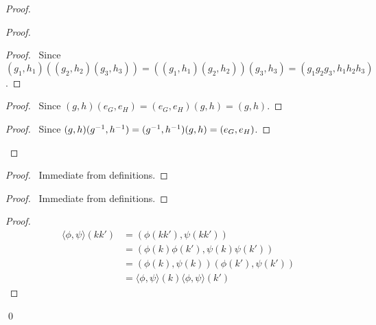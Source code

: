 \begin{proof}
    \pf
    \begin{proof}
        \begin{proof}
            \pf\ Since $(g_1,h_1)((g_2,h_2)(g_3,h_3)) = ((g_1,h_1)(g_2,h_2))(g_3,h_3) = (g_1 g_2 g_3, h_1 h_2 h_3)$.
        \end{proof}
        \begin{proof}
            \pf\ Since $(g,h)(e_G,e_H) = (e_G,e_H)(g,h) = (g,h)$.
        \end{proof}
        \begin{proof}
            \pf\ Since $(g,h)({g}^{-1},{h}^{-1}) = ({g}^{-1},{h}^{-1})(g,h) = (e_G,e_H)$.
        \end{proof}
    \end{proof}
    \begin{proof}
        \pf\ Immediate from definitions.
    \end{proof}
    \begin{proof}
        \pf\ Immediate from definitions.
    \end{proof}
    \begin{proof}
        \pf
        \begin{align*}
            \langle \phi, \psi \rangle (kk') & = (\phi(kk'), \psi(kk'))                                     \\
                                             & = (\phi(k)\phi(k'), \psi(k)\psi(k'))                         \\
                                             & = (\phi(k),\psi(k)) (\phi(k'),\psi(k'))                      \\
                                             & = \langle \phi,\psi \rangle(k) \langle \phi,\psi \rangle(k')
        \end{align*}
    \end{proof}
    \qed
\end{proof}

